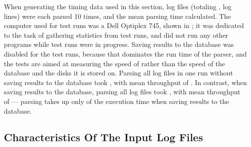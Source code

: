 When generating the timing data used in this section, \numberOFlogFILES{}
log files (totaling ,
\numberOFlogLINEShuman{} log lines) were each parsed 10 times, and the mean
parsing time calculated.  The computer used for test runs was a Dell
Optiplex 745, shown in ; it was dedicated to the task of gathering statistics from test
runs, and did not run any other programs while test runs were in progress.
Saving results to the database was disabled for the test runs, because that
dominates the run time of the parser, and the tests are aimed at measuring
the speed of \parsername{} rather than the speed of the database and the
disks it is stored on.  Parsing all \numberOFlogFILES{} log files in one
run without saving results to the database took
, with mean throughput of
.  In contrast, when saving
results to the database, parsing all \numberOFlogFILES{} log files took
, with mean throughput of
 --- parsing takes up only
 of the
execution time when saving results to the database.

\subsection{Characteristics Of The Input Log Files}

